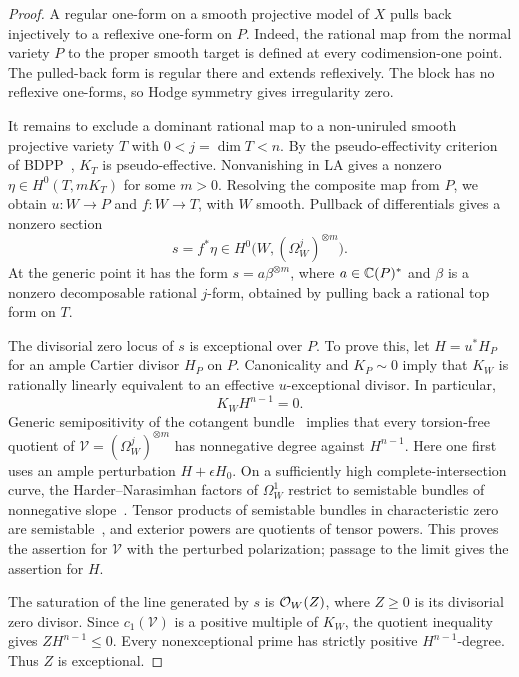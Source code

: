 \begin{proof}
A regular one-form on a smooth projective model of $X$ pulls back
injectively to a reflexive one-form on $P$.  Indeed, the rational map
from the normal variety $P$ to the proper smooth target is defined at
every codimension-one point.  The pulled-back form is regular there
and extends reflexively.  The block has no reflexive one-forms, so
Hodge symmetry gives irregularity zero.

It remains to exclude a dominant rational map to a non-uniruled smooth
projective variety $T$ with $0<j=\dim T<n$.  By the
pseudo-effectivity criterion of BDPP~\cite{BDPP2013}, $K_T$ is
pseudo-effective.  Nonvanishing in LA gives a nonzero
$\eta\in H^0(T,mK_T)$ for some $m>0$.  Resolving the composite map
from $P$, we obtain $u:W\to P$ and $f:W\to T$, with $W$ smooth.
Pullback of differentials gives a nonzero section
\[
             s=f^*\eta\in H^0\bigl(W,(\Omega_W^j)^{\otimes m}\bigr).
\]
At the generic point it has the form $s=a\beta^{\otimes m}$, where
$a\in\mathbb C(P)^*$ and $\beta$ is a nonzero decomposable rational
$j$-form, obtained by pulling back a rational top form on $T$.

The divisorial zero locus of $s$ is exceptional over $P$.  To prove
this, let $H=u^*H_P$ for an ample Cartier divisor $H_P$ on $P$.
Canonicality and $K_P\sim0$ imply that $K_W$ is rationally linearly
equivalent to an effective $u$-exceptional divisor.  In particular,
\[
                            K_W H^{n-1}=0.
\]
Generic semipositivity of the cotangent bundle~\cite{CampanaPaun2015}
implies that every torsion-free quotient of
$\mathcal V=(\Omega_W^j)^{\otimes m}$ has nonnegative degree against
$H^{n-1}$.  Here one first uses an ample perturbation $H+\epsilon H_0$.
On a sufficiently high complete-intersection curve, the
Harder--Narasimhan factors of $\Omega_W^1$ restrict to semistable
bundles of nonnegative slope~\cite{MehtaRamanathan1982}.
Tensor products of semistable bundles in characteristic zero are
semistable~\cite{RamananRamanathan1984}, and exterior powers are
quotients of tensor powers.  This proves the assertion for
$\mathcal V$ with the perturbed polarization; passage to the limit
gives the assertion for $H$.

The saturation of the line generated by $s$ is $\mathcal O_W(Z)$, where
$Z\ge0$ is its divisorial zero divisor.  Since
$c_1(\mathcal V)$ is a positive multiple of $K_W$, the quotient
inequality gives $ZH^{n-1}\le0$.  Every nonexceptional prime has
strictly positive $H^{n-1}$-degree.  Thus $Z$ is exceptional.


\end{proof}
